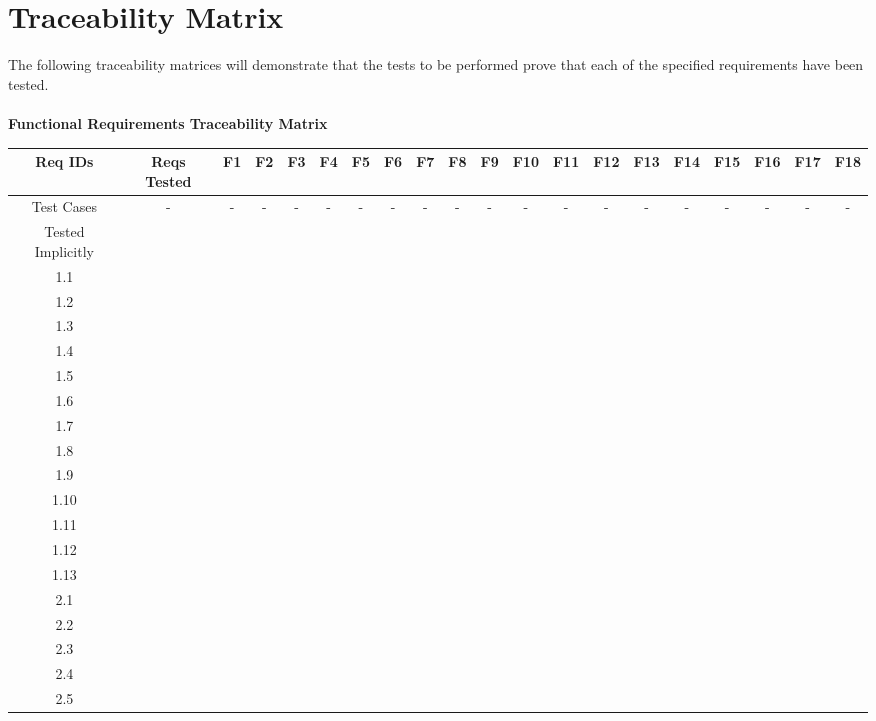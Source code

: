 \documentclass[titlepage]{article}
\begin{document}
\section{Traceability Matrix}
The following traceability matrices will demonstrate that the tests to be performed prove that each of the specified requirements have been tested.\\~\\
\large{\textbf{Functional Requirements Traceability Matrix}}
\begin{center}%
\begin{table}[h!]
\hspace*{-7.5mm}
\begin{tabular}{|c|c|c|c|c |c|c|c|c|c |c|c|c|c|c |c|c|c|c|c|}\hline
\multicolumn{1}{|C{1.5}|}{Req IDs}	&\multicolumn{1}{|C{1}|}{Reqs Tested}	&F1	&F2	&F3	&F4	&F5	&F6	&F7	&F8	&F9	&F10	&F11	&F12	&F13	&F14	&F15	&F16	&F17	&F18\\\hline
\multicolumn{1}{|C{1.5}|}{Test Cases}&- &- &- &- &- &- &- &- &- &- &- &- &- &- &- &- &- &- &-\\\hline
\multicolumn{1}{|C{1.5}|}{Tested Implicitly}&&&& &&&&& &&&&& &&&&&\\\hline
1.1 &&&& &&&&& &&&&& &&&&&\\\hline
1.2 &&&& &&&&& &&&&& &&&&&\\\hline
1.3 &&&& &&&&& &&&&& &&&&&\\\hline
1.4 &&&& &&&&& &&&&& &&&&&\\\hline
1.5 &&&& &&&&& &&&&& &&&&&\\\hline
1.6 &&&& &&&&& &&&&& &&&&&\\\hline
1.7 &&&& &&&&& &&&&& &&&&&\\\hline
1.8 &&&& &&&&& &&&&& &&&&&\\\hline
1.9 &&&& &&&&& &&&&& &&&&&\\\hline
1.10 &&&& &&&&& &&&&& &&&&&\\\hline
1.11 &&&& &&&&& &&&&& &&&&&\\\hline
1.12 &&&& &&&&& &&&&& &&&&&\\\hline
1.13 &&&& &&&&& &&&&& &&&&&\\\hline
2.1 &&&& &&&&& &&&&& &&&&&\\\hline
2.2 &&&& &&&&& &&&&& &&&&&\\\hline
2.3 &&&& &&&&& &&&&& &&&&&\\\hline
2.4 &&&& &&&&& &&&&& &&&&&\\\hline
2.5 &&&& &&&&& &&&&& &&&&&\\\hline

\end{tabular}
\end{table}
\end{center}
\end{document}
